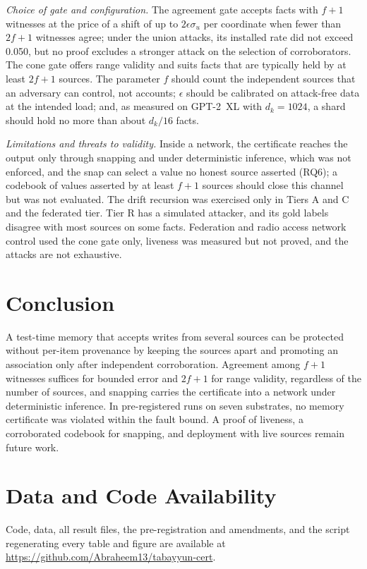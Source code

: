 \documentclass[journal]{IEEEtran}
\theoremstyle{remark}
\begin{document}
\emph{Choice of gate and configuration.} The agreement gate accepts facts with $f+1$ witnesses at the price of a shift of up to $2\epsilon\sigma_u$ per coordinate when fewer than $2f+1$ witnesses agree; under the union attacks, its installed rate did not exceed 0.050, but no proof excludes a stronger attack on the selection of corroborators. The cone gate offers range validity and suits facts that are typically held by at least $2f+1$ sources. The parameter $f$ should count the independent sources that an adversary can control, not accounts; $\epsilon$ should be calibrated on attack-free data at the intended load; and, as measured on \mbox{GPT-2}~XL with $d_k=1024$, a shard should hold no more than about $d_k/16$ facts.

\emph{Limitations and threats to validity.} Inside a network, the certificate reaches the output only through snapping and under deterministic inference, which was not enforced, and the snap can select a value no honest source asserted (RQ6); a codebook of values asserted by at least $f+1$ sources should close this channel but was not evaluated. The drift recursion was exercised only in Tiers A and C and the federated tier. Tier R has a simulated attacker, and its gold labels disagree with most sources on some facts. Federation and radio access network control used the cone gate only, liveness was measured but not proved, and the attacks are not exhaustive.

\section{Conclusion}\label{sec:conclusion}
A test-time memory that accepts writes from several sources can be protected without per-item provenance by keeping the sources apart and promoting an association only after independent corroboration. Agreement among $f+1$ witnesses suffices for bounded error and $2f+1$ for range validity, regardless of the number of sources, and snapping carries the certificate into a network under deterministic inference. In pre-registered runs on seven substrates, no memory certificate was violated within the fault bound. A proof of liveness, a corroborated codebook for snapping, and deployment with live sources remain future work.

\section*{Data and Code Availability}
Code, data, all result files, the pre-registration and amendments, and the script regenerating every table and figure are available at \url{https://github.com/Abraheem13/tabayyun-cert}.



\end{document}
